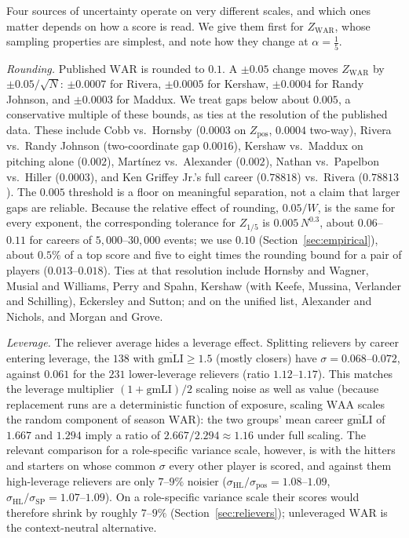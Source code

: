 \documentclass[11pt,letterpaper]{article}
\theoremstyle{plain}
\theoremstyle{definition}
\theoremstyle{remark}
\newcommand{\WAR}{\mathrm{WAR}}
\newcommand{\WAA}{\mathrm{WAA}}
\newcommand{\ZWAR}{Z_{\WAR}}
\newcommand{\Zpos}{Z_{\mathrm{pos}}}
\begin{document}
Four sources of uncertainty operate on very different scales, and which ones matter depends on how a score is read. We give them first for $\ZWAR$, whose sampling properties are simplest, and note how they change at $\alpha = \tfrac15$.

\emph{Rounding.} Published $\WAR$ is rounded to $0.1$. A $\pm0.05$ change moves $\ZWAR$ by $\pm0.05/\sqrt N$: $\pm0.0007$ for Rivera, $\pm0.0005$ for Kershaw, $\pm0.0004$ for Randy Johnson, and $\pm0.0003$ for Maddux. We treat gaps below about $0.005$, a conservative multiple of these bounds, as ties at the resolution of the published data. These include Cobb vs.\ Hornsby ($0.0003$ on $\Zpos$, $0.0004$ two-way), Rivera vs.\ Randy Johnson (two-coordinate gap $0.0016$), Kershaw vs.\ Maddux on pitching alone ($0.002$), Mart\'{i}nez vs.\ Alexander ($0.002$), Nathan vs.\ Papelbon vs.\ Hiller ($0.0003$), and Ken Griffey Jr.'s full career ($0.78818$) vs.\ Rivera ($0.78813$). The $0.005$ threshold is a floor on meaningful separation, not a claim that larger gaps are reliable. Because the relative effect of rounding, $0.05/W$, is the same for every exponent, the corresponding tolerance for $Z_{1/5}$ is $0.005\,N^{0.3}$, about $0.06$--$0.11$ for careers of $5{,}000$--$30{,}000$ events; we use $0.10$ (Section~\ref{sec:empirical}), about $0.5\%$ of a top score and five to eight times the rounding bound for a pair of players ($0.013$--$0.018$). Ties at that resolution include Hornsby and Wagner, Musial and Williams, Perry and Spahn, Kershaw (with Keefe, Mussina, Verlander and Schilling), Eckersley and Sutton; and on the unified list, Alexander and Nichols, and Morgan and Grove.

\emph{Leverage.} The reliever average hides a leverage effect. Splitting relievers by career entering leverage, the $138$ with $\overline{\mathrm{gmLI}} \ge 1.5$ (mostly closers) have $\sigma = 0.068$--$0.072$, against $0.061$ for the $231$ lower-leverage relievers (ratio $1.12$--$1.17$). This matches the leverage multiplier $(1+\mathrm{gmLI})/2$ scaling noise as well as value (because replacement runs are a deterministic function of exposure, scaling $\WAA$ scales the random component of season $\WAR$): the two groups' mean career $\overline{\mathrm{gmLI}}$ of $1.667$ and $1.294$ imply a ratio of $2.667/2.294 \approx 1.16$ under full scaling. The relevant comparison for a role-specific variance scale, however, is with the hitters and starters on whose common $\sigma$ every other player is scored, and against them high-leverage relievers are only $7$--$9\%$ noisier ($\sigma_{\mathrm{HL}}/\sigma_{\mathrm{pos}} = 1.08$--$1.09$, $\sigma_{\mathrm{HL}}/\sigma_{\mathrm{SP}} = 1.07$--$1.09$). On a role-specific variance scale their scores would therefore shrink by roughly $7$--$9\%$ (Section~\ref{sec:relievers}); unleveraged $\WAR$ is the context-neutral alternative.
\end{document}
